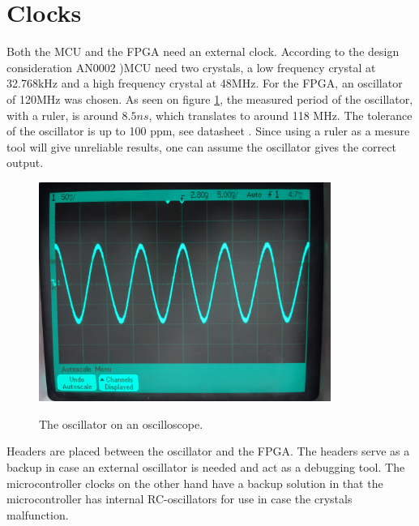 \documentclass[../main/report.tex]{subfiles}
\begin{document}
\section{Clocks}
Both the MCU and the FPGA need an external clock.
According to the design consideration AN0002 \cite{efm32gg-design-consideration})MCU need two crystals, a low frequency crystal at 32.768kHz and a high frequency crystal at 48MHz. 
For the FPGA, an oscillator of 120MHz was chosen.
As seen on figure \ref{fig:oscillator-scope}, the measured period of the oscillator, with a ruler, is around $8.5 ns$, which translates to around 118 MHz.
The tolerance of the oscillator is up to 100 ppm, see datasheet \cite{xpresso-oscillator}.
Since using a ruler as a mesure tool will give unreliable results, one can assume the oscillator gives the correct output.

\begin{figure}[H]
    \centering
    \includegraphics[width=0.85\textwidth]{../pcb/assets/oscillator.jpg}
    \label{fig:oscillator-scope}
    \caption{The oscillator on an oscilloscope.}
\end{figure}

Headers are placed between the oscillator and the FPGA. 
The headers serve as a backup in case an external oscillator is needed and act as a debugging tool.
The microcontroller clocks on the other hand have a backup solution in that the microcontroller has internal RC-oscillators for use in case the crystals malfunction.
\end{document}

